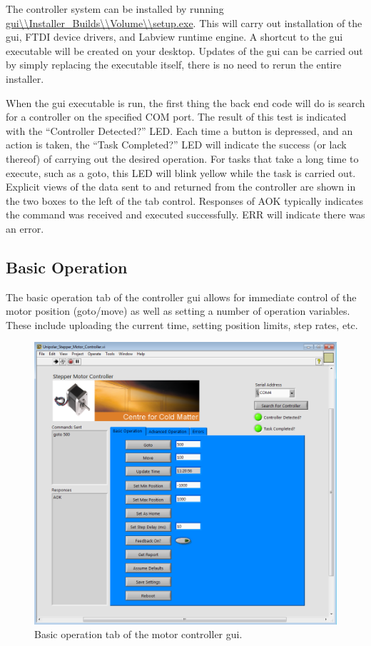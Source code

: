 \documentclass[10pt]{article}
\begin{document}
The controller system can be installed by running
\url{gui\\Installer_Builds\\Volume\\setup.exe}.  This will carry out installation of the gui, FTDI device drivers, and Labview runtime engine.  A shortcut to the gui executable will be created on your desktop.  Updates of the gui can be carried out by simply replacing the executable itself, there is no need to rerun the entire installer.

When the gui executable is run, the first thing the back end code will do is search for a controller on the specified COM port.  The result of this test is indicated with the ``Controller Detected?'' LED.  Each time a button is depressed, and an action is taken, the ``Task Completed?'' LED will indicate the success (or lack thereof) of carrying out the desired operation.  For tasks that take a long time to execute, such as a goto, this LED will blink yellow while the task is carried out.  Explicit views of the data sent to and returned from the controller are shown in the two boxes to the left of the tab control.  Responses of AOK typically indicates the command was received and executed successfully.  ERR will indicate there was an error.  

\subsection{Basic Operation}
\label{Basic_Operation}
The basic operation tab of the controller gui allows for immediate control of the motor position (goto/move) as well as setting a number of operation variables.  These include uploading the current time, setting position limits, step rates, etc.    

\begin{figure}[!htb]
\centering
\includegraphics[width=\linewidth]{Figures/GUI_Basic_Operation.png}
\caption{Basic operation tab of the motor controller gui.}
\label{GUI_Basic_Operation}
\end{figure} 
\end{document}
